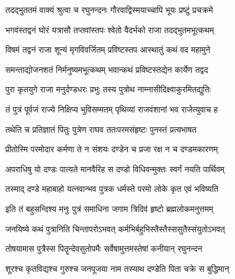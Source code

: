 

\storymeta



\twolineshloka
{तदद्भुततमं वाक्यं श्रुत्वा च रघुनन्दनः}
{गौरवाद्विस्मयाच्चापि भूयः प्रष्टुं प्रचक्रमे}%


\twolineshloka
{भगवंस्तद्वनं घोरं यत्रासौ तप्तवांस्तपः}
{श्वेतो वैदर्भको राजा तदद्भुतमभूत्कथम्}%

\twolineshloka
{विषमं तद्वनं राजा शून्यं मृगविवर्जितम्}
{प्रविष्टस्तप आस्थातुं कथं वद महामुने}%

\twolineshloka
{समन्ताद्योजनशतं निर्मनुष्यमभूत्कथम्}
{भवान्कथं प्रविष्टस्तद्येन कार्येण तद्वद}%


\twolineshloka
{पुरा कृतयुगे राजा मनुर्दण्डधरः प्रभुः}
{तस्य पुत्रोथ नाम्नासीदिक्ष्वाकुरमितद्युतिः}%

\twolineshloka
{तं पुत्रं पूर्वजं राज्ये निक्षिप्य भुविसम्मतम्}
{पृथिव्यां राजवंशानां भव राजेत्युवाच ह}%

\twolineshloka
{तथेति च प्रतिज्ञातं पितुः पुत्रेण राघव}
{ततःपरमसंहृष्टः पुनस्तं प्रत्यभाषत}%

\twolineshloka
{प्रीतोस्मि परमोदार कर्मणा ते न संशयः}
{दण्डेन च प्रजा रक्ष न च दण्डमकारणम्}%

\twolineshloka
{अपराधिषु यो दण्डः पात्यते मानवैरिह}
{स दण्डो विधिवन्मुक्तः स्वर्गं नयति पार्थिवम्}%

\twolineshloka
{तस्माद् दण्डे महाबाहो यत्नवान्भव पुत्रक}
{धर्मस्ते परमो लोके कृत एवं भविष्यति}%

\twolineshloka
{इति तं बहुसन्दिश्य मनुः पुत्रं समाधिना}
{जगाम त्रिदिवं हृष्टो ब्रह्मलोकमनुत्तमम्}%

\twolineshloka
{जनयिष्ये कथं पुत्रानिति चिन्तापरोऽभवत्}
{कर्मभिर्बहुभिस्तैस्तैस्ससुतैस्संयुतोऽभवत्}%

\twolineshloka
{तोषयामास पुत्रैस्स पितॄन्देवसुतोपमैः}
{सर्वेषामुत्तमस्तेषां कनीयान् रघुनन्दन}%

\twolineshloka
{शूरश्च कृतविद्यश्च गुरुश्च जनपूजया}
{नाम तस्याथ दण्डेति पिता चक्रे स बुद्धिमान्}%

